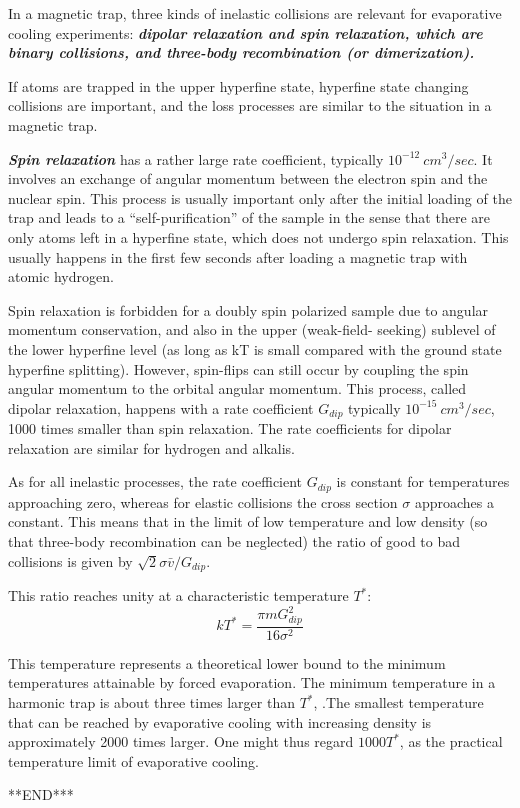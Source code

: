 \documentclass[12]{article}
\begin{document}
In a magnetic trap, three kinds of inelastic collisions are relevant for evaporative cooling experiments: \textbf{\textit{dipolar relaxation and spin relaxation, which are binary collisions, and three-body recombination (or dimerization).}}

If atoms are trapped in the upper hyperfine state, hyperfine state changing collisions are important, and the loss processes are similar to the situation in a magnetic trap.

\textbf{\textit{Spin relaxation}} has a rather large rate coefficient, typically $10^{-12}\ cm^3/sec$. It involves an exchange of angular momentum between the electron spin and the nuclear spin. This process is usually important only after the initial loading of the trap and leads to a “self-purification” of the sample in the sense that there are only atoms left in a hyperfine state, which does not undergo spin relaxation. This usually happens in the first few seconds after loading a magnetic trap with atomic hydrogen.

Spin relaxation is forbidden for a doubly spin polarized sample due to angular momentum conservation, and also in the upper (weak-field- seeking) sublevel of the lower hyperfine level (as long as kT is small compared with the ground state hyperfine splitting). However, spin-flips can still occur by coupling the spin angular momentum to the orbital angular momentum. This process, called dipolar relaxation, happens with a rate coefficient $G_{dip}$ typically $10^{-15}\ cm^3/sec$, 1000 times smaller than spin relaxation. The rate coefficients for dipolar relaxation are similar for hydrogen and alkalis.

As for all inelastic processes, the rate coefficient $G_{dip}$ is constant for temperatures approaching zero, whereas for elastic collisions the cross section $\sigma$ approaches a constant. This means that in the limit of low temperature and low density (so that three-body recombination can be neglected) the ratio of good to bad collisions is given by $\sqrt{2} \sigma \bar{v} /G_{dip}$.

This ratio reaches unity at a characteristic temperature $T^*$: $$kT^*=\frac{\pi m G^2_{dip}}{16 \sigma^2} $$

This temperature represents a theoretical lower bound to the minimum temperatures attainable by forced evaporation. The minimum temperature in a harmonic trap is about three times larger than $T^*$, .The smallest temperature that can be reached by evaporative cooling with increasing density is approximately 2000 times larger. One might thus regard $1000T^*$, as the practical temperature limit of evaporative cooling.


       
       
       
       
       
       
       
       
       



\begin{center}%
	\Large***END***
\end{center}
\end{document}
